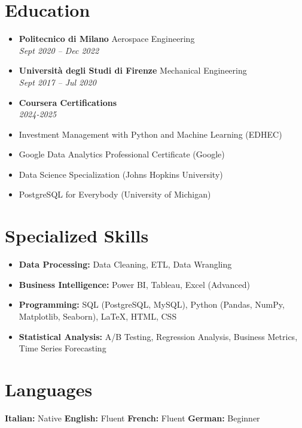 \documentclass[letterpaper,10.5pt]{article}
\newcommand{\resumeEntry}[4]{
  \item\textbf{#1} \hfill #2\\
  \textit{#3} \hfill \textit{#4}
}
\begin{document}
\section*{Education}\vspace{-5pt}
\begin{itemize}[leftmargin=0.2in]
    \resumeEntry{Politecnico di Milano}{Aerospace Engineering}{Sept 2020 -- Dec 2022}{}
    \resumeEntry{Università degli Studi di Firenze}{Mechanical Engineering}{Sept 2017 -- Jul 2020}{}
    \resumeEntry{Coursera Certifications}{}{2024-2025}{}
\end{itemize}
\begin{multicols}{2}
    \small
    \begin{itemize}[leftmargin=0.4 in, label={-}]
        \item Investment Management with Python and Machine Learning (EDHEC)
        \item Google Data Analytics Professional Certificate (Google)
    \end{itemize}
    \begin{itemize}[leftmargin=0.3 in, label={-}]
        \item Data Science Specialization (Johns Hopkins University)
        \item PostgreSQL for Everybody (University of Michigan)
    \end{itemize}
\end{multicols}

\section*{Specialized Skills}\vspace{-15pt}
\begin{multicols}{2}
\begin{itemize}[leftmargin=0.2in]
    \item \textbf{Data Processing:} Data Cleaning, ETL, Data Wrangling
    \item \textbf{Business Intelligence:} Power BI, Tableau, Excel (Advanced)
    \item \textbf{Programming:} SQL (PostgreSQL, MySQL), Python (Pandas, NumPy, Matplotlib, Seaborn), LaTeX, HTML, CSS
    \item \textbf{Statistical Analysis:} A/B Testing, Regression Analysis, Business Metrics, Time Series Forecasting
\end{itemize}
\end{multicols}

\section*{Languages}\vspace{- 5 pt}
\textbf{Italian:} Native \hspace{20pt} \textbf{English:} Fluent \hspace{20pt} \textbf{French:} Fluent \hspace{20pt} \textbf{German:} Beginner
\end{document}
